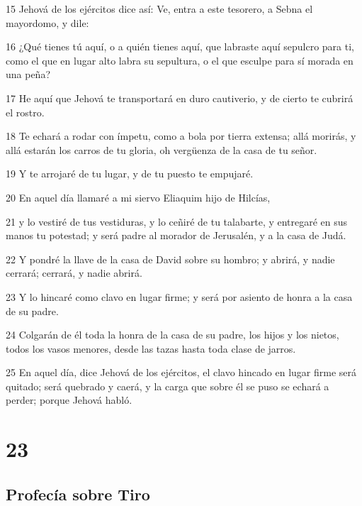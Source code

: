 \par 15 Jehová de los ejércitos dice así: Ve, entra a este tesorero, a Sebna el mayordomo, y dile:
\par 16 ¿Qué tienes tú aquí, o a quién tienes aquí, que labraste aquí sepulcro para ti, como el que en lugar alto labra su sepultura, o el que esculpe para sí morada en una peña?
\par 17 He aquí que Jehová te transportará en duro cautiverio, y de cierto te cubrirá el rostro.
\par 18 Te echará a rodar con ímpetu, como a bola por tierra extensa; allá morirás, y allá estarán los carros de tu gloria, oh vergüenza de la casa de tu señor.
\par 19 Y te arrojaré de tu lugar, y de tu puesto te empujaré.
\par 20 En aquel día llamaré a mi siervo Eliaquim hijo de Hilcías,
\par 21 y lo vestiré de tus vestiduras, y lo ceñiré de tu talabarte, y entregaré en sus manos tu potestad; y será padre al morador de Jerusalén, y a la casa de Judá.
\par 22 Y pondré la llave de la casa de David sobre su hombro; y abrirá, y nadie cerrará; cerrará, y nadie abrirá. 
\par 23 Y lo hincaré como clavo en lugar firme; y será por asiento de honra a la casa de su padre.
\par 24 Colgarán de él toda la honra de la casa de su padre, los hijos y los nietos, todos los vasos menores, desde las tazas hasta toda clase de jarros.
\par 25 En aquel día, dice Jehová de los ejércitos, el clavo hincado en lugar firme será quitado; será quebrado y caerá, y la carga que sobre él se puso se echará a perder; porque Jehová habló. 

\chapter{23}

\section*{Profecía sobre Tiro}

